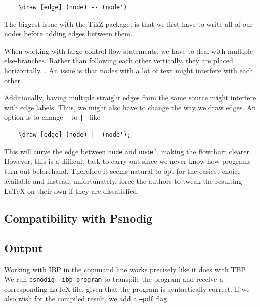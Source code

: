 \begin{verbatim}
    \draw [edge] (node) -- (node')
\end{verbatim}

The biggest issue with the TikZ package, is that we first have to write all of our nodes before adding edges between them. 

When working with large control flow statements, we have to deal with multiple else-branches. Rather than following each other vertically, they are placed horizontally. . An issue is that nodes with a lot of text might interfere with each other. \hfill \\


Additionally, having multiple straight edges from the same source might interfere with edge labels. Thus, we might also have to change the way we draw edges. An option is to change \texttt{--} to \texttt{|-} like

\begin{lstlisting}
    \draw [edge] (node) |- (node');
\end{lstlisting}

This will curve the edge between \texttt{node} and \texttt{node'}, making the flowchart clearer. However, this is a difficult task to carry out since we never know how programs turn out beforehand. Therefore it seems natural to opt for the easiest choice available and instead, unfortunately, force the authors to tweak the resulting LaTeX on their own if they are dissatisfied.

\subsection{Compatibility with Psnodig}


\subsection{Output}

Working with IBP in the command line works precisely like it does with TBP. We run \texttt{psnodig --ibp program} to transpile the program and receive a corresponding LaTeX file, given that the program is syntactically correct. If we also wish for the compiled result, we add a \texttt{--pdf} flag. \hfill \\

